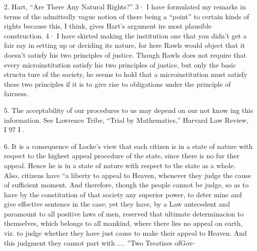 \documentclass[11pt,openany]{book}
\begin{document}
{2. Hart, ``Are There Any Natural Rights?'' 3· I have formulated my remarks in terms of the admittedly vague notion of there being a ``point'' to certain kinds of rights because this, I think, gives Hart's argument irs most plausible construction. 4· I have skirted making the institution one that you didn't get a fair say in setting up or deciding its nature, for here Rawls would object that it doesn't satisfy his two principles of justice. Though Rawls does not require that every microinstitution satisfy his two principles of justice, but only the basic structu ture of the society, he seems to hold that a microinstitution must satisfy these two principles if it is to give rise to obligations under the principle of fairness.\par

5. The acceptability of our procedures to us may depend on our not know ing this information. See Lawrence Tribe, ``Trial by Mathematics,'' Harvard Law Review, I 97 I .\par

6. It is a consequence of Locke's view that each citizen is in a state of nature with respect to the highest appeal procedure of the state, since there is no fur ther appeal. Hence he is in a state of nature with respect to the state as a whole. Also, citizens have ``a liberty to appeal to Heaven, whenever they judge the cause of sufficient moment. And therefore, though the people cannot be judge, so as to have by the constitution of that society any superior power, to deter mine and give effective sentence in the case; yet they have, by a Law antecedent and paramount to all positive laws of men, reserved that ultimate determinacion to themselves, which belongs to all mankind, where there lies no appeal on earth, viz. to judge whether they have just cause to make their appeal to Heaven. And this judgment they cannot part with .... ''Two Treatises ofGov-\par

}
\end{document}
